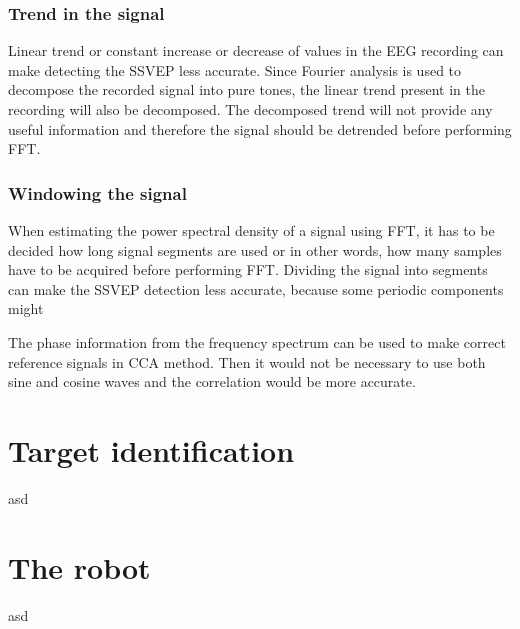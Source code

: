 \subsubsection{Trend in the signal}

Linear trend or constant increase or decrease of values in the \gls{EEG} recording can make detecting the \gls{SSVEP} less accurate. Since Fourier analysis is used to decompose the recorded signal into \glspl{pure tone}, the linear trend present in the recording will also be decomposed. The decomposed trend will not provide any useful information and therefore the signal should be detrended before performing \gls{FFT}.

\subsubsection{Windowing the signal}

When estimating the \gls{power spectral density} of a signal using \gls{FFT}, it has to be decided how long signal segments are used or in other words, how many samples have to be acquired before performing \gls{FFT}. Dividing the signal into segments can make the \gls{SSVEP} detection less accurate, because some periodic components might

The phase information from the frequency spectrum can be used to make correct reference signals in \gls{CCA} method. Then it would not be necessary to use both sine and cosine waves and the correlation would be more accurate.

\section{Target identification}
asd
\section{The robot}
asd
